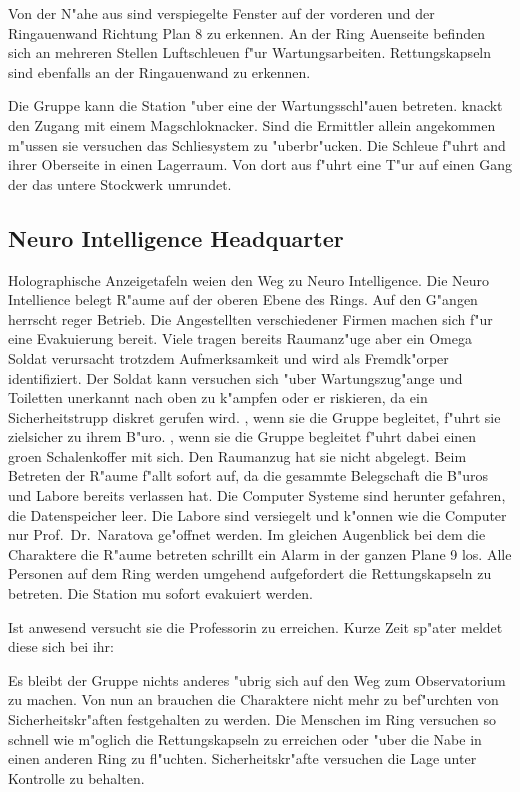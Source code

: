 Von der N"ahe aus sind verspiegelte Fenster auf der vorderen und der Ringau\3enwand Richtung Plan 8 zu erkennen. An der Ring Au\3enseite befinden sich an mehreren Stellen Luftschleu\3en f"ur Wartungsarbeiten. Rettungskapseln sind ebenfalls an der Ringau\3enwand zu erkennen.

Die Gruppe kann die Station "uber eine der Wartungsschl"au\3en betreten. \xl{} knackt den Zugang mit einem Magschlo\3knacker. Sind die Ermittler allein angekommen m"ussen sie versuchen das Schlie\3system zu "uberbr"ucken. Die Schleu\3e f"uhrt and ihrer Oberseite in einen Lagerraum. Von dort aus f"uhrt eine T"ur auf einen Gang der das untere Stockwerk umrundet. 

\subsection{Neuro Intelligence Headquarter}
Holographische Anzeigetafeln wei\3en den Weg zu Neuro Intelligence. Die Neuro Intellience belegt R"aume auf der oberen Ebene des Rings. Auf den G"angen herrscht reger Betrieb. Die Angestellten verschiedener Firmen machen sich f"ur eine Evakuierung bereit. Viele tragen bereits Raumanz"uge aber ein Omega Soldat verursacht trotzdem Aufmerksamkeit und wird als Fremdk"orper identifiziert. Der Soldat kann versuchen sich "uber Wartungszug"ange und Toiletten unerkannt nach oben zu k"ampfen oder er riskieren, da\3 ein Sicherheitstrupp diskret gerufen wird. \ml{}, wenn sie die Gruppe begleitet, f"uhrt sie zielsicher zu ihrem B"uro. \xl{}, wenn sie die Gruppe begleitet f"uhrt dabei einen gro\3en Schalenkoffer mit sich. Den Raumanzug hat sie nicht abgelegt. Beim Betreten der R"aume f"allt sofort auf, da\3 die gesammte Belegschaft die B"uros und Labore bereits verlassen hat. Die Computer Systeme sind herunter gefahren, die Datenspeicher leer. Die Labore sind versiegelt und k"onnen wie die Computer nur Prof.~Dr.~Naratova ge"offnet werden. Im gleichen Augenblick bei dem die Charaktere die R"aume betreten schrillt ein Alarm in der ganzen Plane 9 los. Alle Personen auf dem Ring werden umgehend aufgefordert die Rettungskapseln zu betreten. Die Station mu\3 sofort evakuiert werden. 

Ist \ml{} anwesend versucht sie die Professorin zu erreichen. Kurze Zeit sp"ater meldet diese sich bei ihr:


Es bleibt der Gruppe nichts anderes "ubrig sich auf den Weg zum Observatorium zu machen. Von nun an brauchen die Charaktere nicht mehr zu bef"urchten von Sicherheitskr"aften festgehalten zu werden. Die Menschen im Ring versuchen so schnell wie m"oglich die Rettungskapseln zu erreichen oder "uber die Nabe in einen anderen Ring zu fl"uchten. Sicherheitskr"afte versuchen die Lage unter Kontrolle zu behalten.

